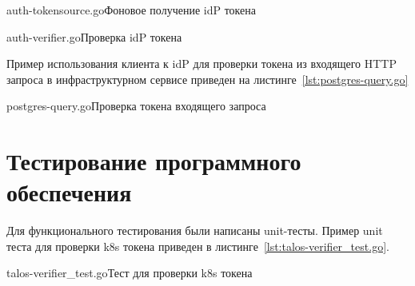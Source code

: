 	{auth-tokensource.go}{Фоновое получение idP токена}

	{auth-verifier.go}{Проверка idP токена}

Пример использования клиента к idP для проверки токена из входящего HTTP запроса в инфраструктурном сервисе приведен на листинге~\ref{lst:postgres-query.go}

	{postgres-query.go}{Проверка токена входящего запроса}

\section{Тестирование программного обеспечения}

Для функционального тестирования были написаны unit-тесты.
Пример unit теста для проверки k8s токена приведен в листинге~\ref{lst:talos-verifier_test.go}.

	{talos-verifier_test.go}{Тест для проверки k8s токена}

%	
%
%
